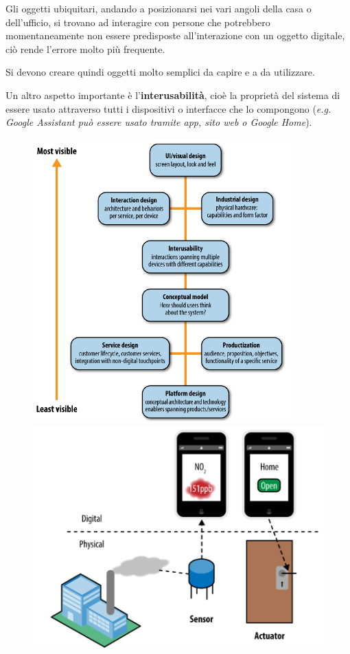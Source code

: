 \documentclass[a4paper,11pt,oneside]{book}
\begin{document}
Gli oggetti ubiquitari, andando a posizionarsi nei vari angoli della casa o dell'ufficio, si trovano ad interagire con persone che potrebbero momentaneamente non essere predisposte all'interazione con un oggetto digitale, ciò rende l'errore molto più frequente.

Si devono creare quindi oggetti molto semplici da capire e a da utilizzare.

Un altro aspetto importante è l'\textbf{interusabilità}, cioè la proprietà del sistema di essere usato attraverso tutti i dispositivi o interfacce che lo compongono (\textit{e.g. Google Assistant può essere usato tramite app, sito web o Google Home}).

\begin{figure}[!h]
	\includegraphics[scale=0.55]{immagini/UX_IoT.png}
	\includegraphics[scale=0.5]{immagini/Sensors_actuators.png}
\end{figure}
\end{document}
